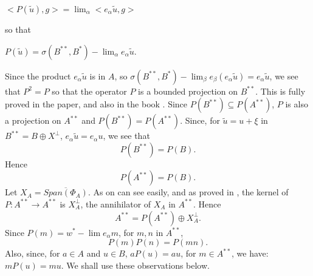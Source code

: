 \documentclass[12pt, twoside, leqno]{article}
\theoremstyle{definition}
\theoremstyle{definition}
\numberwithin{equation}{section}
\begin{document}
$ <P(\tilde{u}),g>=\lim_{\alpha}<e_{\alpha}\tilde{u},g> $\vspace{2mm}

\noindent so that\vspace{2mm}

$ P(\tilde{u})=\sigma(B^{**},B^{*})-\lim_{\alpha}e_{\alpha}\tilde{u} $.\vspace{2mm}

Since the product $e_{\alpha}\tilde{u}$ is in $A$, so $\sigma(B^{**},B^{*})-\lim_{\beta}e_{\beta}(e_{\alpha}\tilde{u})=e_{\alpha}\tilde{u}$, we see that $P^{2}=P$ so that the operator $P$ is a bounded projection on $B^{**}$. This is fully proved in the paper\cite {lau_ulger_01}, and also in the book \cite [Theorem 2.3.84] {dales_ulger_02}. Since $P(B^{**})\subseteq P(A^{**})$, $P$ is also a projection on $A^{**}$ and $P(B^{**})=P(A^{**})$. Since, for $\tilde{u}=u+\xi$ in $B^{**}=B\oplus X^{\perp}$, $e_{\alpha}\tilde{u}=e_{\alpha}u$, we see that $$P(B^{**})=P(B).$$ Hence $$P(A^{**})=P(B).$$ Let $X_{A}=\overline{Span(\Phi_{A})}$. As on can see easily, and as proved in \cite [Proposition 4.3] {lau_ulger_01}, the kernel of $P:A^{**}\rightarrow A^{**}$ is $X_{A}^{\perp}$, the annihilator of $X_{A}$ in $A^{**}$. Hence $$ A^{**}=P(A^{**})\oplus X_{A}^{\perp}.$$ Since $P(m)=w^{*}-\lim e_{\alpha}m$, for $m,n$ in $A^{**}$, $$P(m)P(n)=P(mn).$$ Also, since, for $a\in A$ and $u\in B$, $aP(u)=au$, for $m\in A^{**}$, we have: $mP(u)=mu$. We shall use these observations below.
\end{document}
